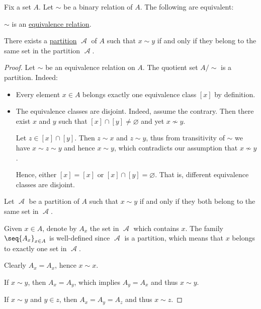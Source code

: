 \begin{proposition}\label{thm:equivalence_partition}
  Fix a set \( A \). Let \( {\sim} \) be a binary relation of \( A \). The following are equivalent:
  \begin{thmenum}
     \( {\sim} \) is an \hyperref[def:equivalence_relation]{equivalence relation}.

     There exists a \hyperref[def:set_partition]{partition} \( \mscrA \) of \( A \) such that \( x \sim y \) if and only if they belong to the same set in the partition \( \mscrA \).
  \end{thmenum}
\end{proposition}
\begin{proof}
   Let \( {\sim} \) be an equivalence relation on \( A \). The quotient set \( A / {\sim} \) is a partition. Indeed:
  \begin{itemize}
    \item Every element \( x \in A \) belongs exactly one equivalence class \( [x] \) by definition.

    \item The equivalence classes are disjoint. Indeed, assume the contrary. Then there exist \( x \) and \( y \) such that \( [x] \cap [y] \neq \varnothing \) and yet \( x \not\sim y \).

    Let \( z \in [x] \cap [y] \). Then \( z \sim x \) and \( z \sim y \), thus from transitivity of \( {\sim} \) we have \( x \sim z \sim y \) and hence \( x \sim y \), which contradicts our assumption that \( x \not\sim y \).

    Hence, either \( [x] = [x] \) or \( [x] \cap [y] = \varnothing \). That is, different equivalence classes are disjoint.
  \end{itemize}

   Let \( \mscrA \) be a partition of \( A \) such that \( x \sim y \) if and only if they both belong to the same set in \( \mscrA \).

  Given \( x \in A \), denote by \( A_x \) the set in \( \mscrA \) which contains \( x \). The family \( \seq{ A_x }_{x \in A} \) is well-defined since \( \mscrA \) is a partition, which means that \( x \) belongs to exactly one set in \( \mscrA \).

   Clearly \( A_x = A_x \), hence \( x \sim x \).

   If \( x \sim y \), then \( A_x = A_y \), which implies \( A_y = A_x \) and thus \( x \sim y \).

   If \( x \sim y \) and \( y \in z \), then \( A_x = A_y = A_z \) and thus \( x \sim z \).
\end{proof}

